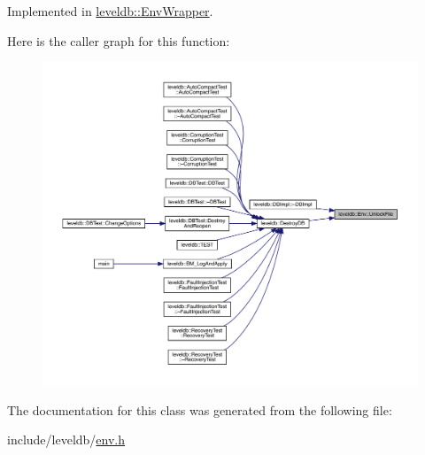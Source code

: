 Implemented in \mbox{\hyperlink{classleveldb_1_1_env_wrapper_ab83a07da23586f1b61e709b1512a2807}{leveldb\+::\+Env\+Wrapper}}.

Here is the caller graph for this function\+:
\nopagebreak
\begin{figure}[H]
\begin{center}
\leavevmode
\includegraphics[width=350pt]{classleveldb_1_1_env_a194a2ee3c21bc0b204ad0e5bc3b81d4b_icgraph}
\end{center}
\end{figure}


The documentation for this class was generated from the following file\+:\begin{DoxyCompactItemize}
\item 
include/leveldb/\mbox{\hyperlink{env_8h}{env.\+h}}\end{DoxyCompactItemize}
